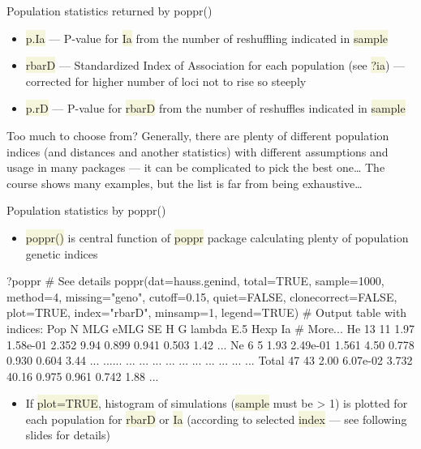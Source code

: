 \documentclass[compress, xelatex, 11pt, xcolor=svgnames, aspectratio=169, url={hyphens, lowtilde}]{beamer}
\renewcommand{\texttt}[1]{\colorbox{Beige}{{\ttfamily #1}}}
\begin{document}
\begin{frame}[allowframebreaks]{Population statistics returned by poppr()}
\begin{itemize}
\begin{itemize}
		\end{itemize}
		\item \texttt{p.Ia} --- P-value for \texttt{Ia} from the number of reshuffling indicated in \texttt{sample}
		\item \texttt{rbarD} --- Standardized Index of Association for each population (see \texttt{?ia}) --- corrected for higher number of loci not to rise so steeply
		\item \texttt{p.rD} --- P-value for \texttt{rbarD} from the number of reshuffles indicated in \texttt{sample}
	\end{itemize}
	\begin{block}{Too much to choose from?}
		Generally, there are plenty of different population indices (and distances and another statistics) with different assumptions and usage in many packages --- it can be complicated to pick the best one\ldots{ }The course shows many examples, but the list is far from being exhaustive\ldots
	\end{block}
\end{frame}

\begin{frame}[fragile]{Population statistics by poppr()}
	\vfill
	\begin{itemize}
		\item \texttt{poppr()} is central function of \texttt{poppr} package calculating plenty of population genetic indices
	\end{itemize}
	\vfill
	\begin{spluscode}
    ?poppr # See details
    poppr(dat=hauss.genind, total=TRUE, sample=1000, method=4,
      missing="geno", cutoff=0.15, quiet=FALSE, clonecorrect=FALSE,
      plot=TRUE, index="rbarD", minsamp=1, legend=TRUE)
    # Output table with indices:
      Pop  N MLG eMLG       SE     H     G lambda   E.5  Hexp   Ia # More...
       He 13  11 1.97 1.58e-01 2.352  9.94  0.899 0.941 0.503 1.42 ...
       Ne  6   5 1.93 2.49e-01 1.561  4.50  0.778 0.930 0.604 3.44 ...
      ...... ...  ...      ...   ...   ...    ...   ...   ...  ... ...
    Total 47  43 2.00 6.07e-02 3.732 40.16  0.975 0.961 0.742 1.88 ...
	\end{spluscode}
	\vfill
	\begin{itemize}
		\item If \texttt{plot=TRUE}, histogram of simulations (\texttt{sample} must be > 1) is plotted for each population for \texttt{rbarD} or \texttt{Ia} (according to selected \texttt{index} --- see following slides for details)
	\end{itemize}
	\vfill
\end{frame}
\end{document}
